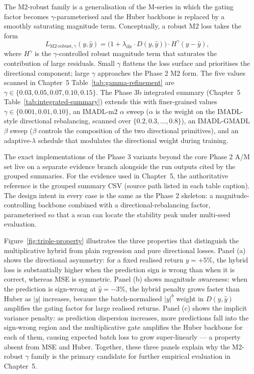 The M2-robust family is a generalisation of the M-series in which the gating factor becomes $\gamma$-parameterised and the Huber backbone is replaced by a smoothly saturating magnitude term. Conceptually, a robust M2 loss takes the form
\[
L_{\mathrm{M2\text{-}robust}, \gamma}(y, \hat y)
= \big(1 + \lambda_{\mathrm{dir}} \cdot D(y, \hat y)\big) \cdot H^{\gamma}(y - \hat y),
\]
where $H^{\gamma}$ is the $\gamma$-controlled robust magnitude term that saturates the contribution of large residuals. Small $\gamma$ flattens the loss surface and prioritises the directional component; large $\gamma$ approaches the Phase 2 M2 form. The five values scanned in Chapter~5 Table~\ref{tab:gamma-refinement} are $\gamma \in \{0.03, 0.05, 0.07, 0.10, 0.15\}$. The Phase 3b integrated summary (Chapter~5 Table~\ref{tab:integrated-summary}) extends this with finer-grained values $\gamma \in \{0.001, 0.01, 0.10\}$, an IMADL-m2 $\alpha$ sweep ($\alpha$ is the weight on the IMADL-style directional rebalancing, scanned over $\{0.2, 0.3, \ldots, 0.8\}$), an IMADL-GMADL $\beta$ sweep ($\beta$ controls the composition of the two directional primitives), and an adaptive-$\lambda$ schedule that modulates the directional weight during training.

The exact implementations of the Phase 3 variants beyond the core Phase 2 A/M set live on a separate evidence branch alongside the run outputs cited by the grouped summaries. For the evidence used in Chapter~5, the authoritative reference is the grouped summary CSV (source path listed in each table caption). The design intent in every case is the same as the Phase 2 skeleton: a magnitude-controlling backbone combined with a directional-rebalancing factor, parameterised so that a scan can locate the stability peak under multi-seed evaluation.

Figure~\ref{fig:triple-property} illustrates the three properties that distinguish the multiplicative hybrid from plain regression and pure directional losses. Panel (a) shows the directional asymmetry: for a fixed realised return $y = +5\%$, the hybrid loss is substantially higher when the prediction sign is wrong than when it is correct, whereas MSE is symmetric. Panel (b) shows magnitude awareness: when the prediction is sign-wrong at $\hat y = -3\%$, the hybrid penalty grows faster than Huber as $|y|$ increases, because the batch-normalised $|y|^b$ weight in $D(y, \hat y)$ amplifies the gating factor for large realised returns. Panel (c) shows the implicit variance penalty: as prediction dispersion increases, more predictions fall into the sign-wrong region and the multiplicative gate amplifies the Huber backbone for each of them, causing expected batch loss to grow super-linearly --- a property absent from MSE and Huber. Together, these three panels explain why the M2-robust $\gamma$ family is the primary candidate for further empirical evaluation in Chapter~5.

